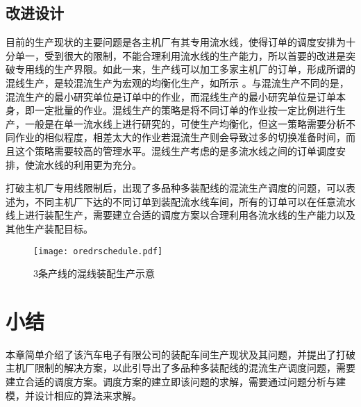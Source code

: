\subsection{改进设计}
目前的生产现状的主要问题是各主机厂有其专用流水线，使得订单的调度安排为十分单一，受到很大的限制，不能合理利用流水线的生产能力，所以首要的改进是突破专用线的生产界限。如此一来，生产线可以加工多家主机厂的订单，形成所谓的混线生产，是较混流生产为宏观的均衡化生产，如所示
。与混流生产不同的是，混流生产的最小研究单位是订单中的作业，而混线生产的最小研究单位是订单本身，即一定批量的作业。混线生产的策略是将不同订单的作业按一定比例进行生产，一般是在单一流水线上进行研究的，可使生产均衡化，但这一策略需要分析不同作业的相似程度，相差太大的作业若混流生产则会导致过多的切换准备时间，而且这个策略需要较高的管理水平。混线生产考虑的是多流水线之间的订单调度安排，使流水线的利用更为充分。

打破主机厂专用线限制后，出现了多品种多装配线的混流生产调度的问题，可以表述为，不同主机厂下达的不同订单到装配流水线车间，所有的订单可以在任意流水线上进行装配生产，需要建立合适的调度方案以合理利用各流水线的生产能力以及其他生产装配目标。

\begin{figure}[h]
\centering
\texttt{[image: oredrschedule.pdf]}
\caption{$3$条产线的混线装配生产示意\label{fig:orderschedule}}
\end{figure}

\section{小结}
本章简单介绍了该汽车电子有限公司的装配车间生产现状及其问题，并提出了打破主机厂限制的解决方案，以此引导出了多品种多装配线的混流生产调度问题，需要建立合适的调度方案。调度方案的建立即该问题的求解，需要通过问题分析与建模，并设计相应的算法来求解。